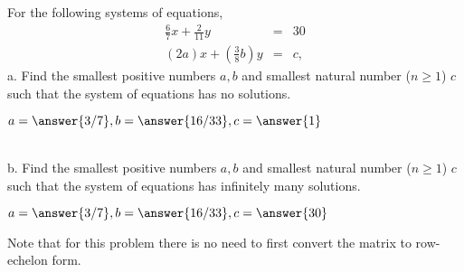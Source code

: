 \documentclass{ximera}
\author{Parisa Fatheddin}
\begin{document}
\begin{exercise}
For the following systems of equations,
\begin{eqnarray*}
\frac{6}{7} x + \frac{2}{11}y &=& 30\\
(2a) x + \left(\frac{3}{8} b\right) y &=& c,
\end{eqnarray*}
a. Find the smallest positive numbers $a,b$ and smallest natural number ($n\geq1$) $c$ such that the system of equations has no solutions.
\begin{prompt}
 $a= \answer{3/7}, b= \answer{16/33}, c=\answer{1}$
 \end{prompt}\\

b. Find the smallest positive numbers $a,b$ and smallest natural number ($n\geq1$) $c$ such that the system of equations has infinitely many solutions.
\begin{prompt}
 $a= \answer{3/7}, b= \answer{16/33}, c = \answer{30}$
 \end{prompt}
\begin{hint}
 Note that for this problem there is no need to first convert the matrix to row-echelon form.
\end{hint}
\end{exercise}
\end{document}
